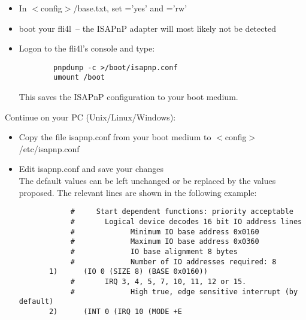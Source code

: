   \begin{itemize}
  \item In $<$config$>$/base.txt, set ='yes' and
    ='rw'
  \item boot your fli4l~-- the ISAPnP adapter will most likely not be detected
  \item Logon to the fli4l's console and type:
\begin{example}
\begin{verbatim}
        pnpdump -c >/boot/isapnp.conf
        umount /boot
\end{verbatim}
\end{example}
    This saves the ISAPnP configuration to your boot medium.
  \end{itemize}
  Continue on your PC (Unix/Linux/Windows):
  \begin{itemize}
  \item Copy the file isapnp.conf from your boot medium to $<$config$>$/etc/isapnp.conf
  \item Edit isapnp.conf and save your changes\\
        The default values can be left unchanged or be replaced by the values
        proposed. The relevant lines are shown in the following example:

\begin{example}
\begin{verbatim}
            #     Start dependent functions: priority acceptable
            #       Logical device decodes 16 bit IO address lines
            #             Minimum IO base address 0x0160
            #             Maximum IO base address 0x0360
            #             IO base alignment 8 bytes
            #             Number of IO addresses required: 8
       1)      (IO 0 (SIZE 8) (BASE 0x0160))
            #       IRQ 3, 4, 5, 7, 10, 11, 12 or 15.
            #             High true, edge sensitive interrupt (by default)
       2)      (INT 0 (IRQ 10 (MODE +E
\end{verbatim}
\end{example}

\end{itemize}
